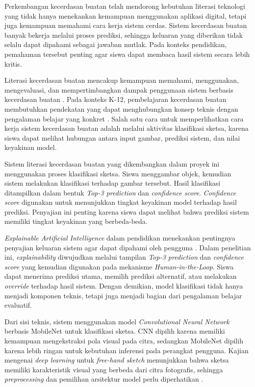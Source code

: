 \documentclass[12pt,a4paper,oneside,openany]{report}
\begin{document}
Perkembangan kecerdasan buatan telah mendorong kebutuhan literasi teknologi yang tidak hanya menekankan kemampuan menggunakan aplikasi digital, tetapi juga kemampuan memahami cara kerja sistem cerdas. Sistem kecerdasan buatan banyak bekerja melalui proses prediksi, sehingga keluaran yang diberikan tidak selalu dapat dipahami sebagai jawaban mutlak. Pada konteks pendidikan, pemahaman tersebut penting agar siswa dapat membaca hasil sistem secara lebih kritis.

Literasi kecerdasan buatan mencakup kemampuan memahami, menggunakan, mengevaluasi, dan mempertimbangkan dampak penggunaan sistem berbasis kecerdasan buatan \cite{ref1}. Pada konteks K-12, pembelajaran kecerdasan buatan membutuhkan pendekatan yang dapat menghubungkan konsep teknis dengan pengalaman belajar yang konkret \cite{ref2}. Salah satu cara untuk memperlihatkan cara kerja sistem kecerdasan buatan adalah melalui aktivitas klasifikasi sketsa, karena siswa dapat melihat hubungan antara input gambar, prediksi sistem, dan nilai keyakinan model.

Sistem literasi kecerdasan buatan yang dikembangkan dalam proyek ini menggunakan proses klasifikasi sketsa. Siswa menggambar objek, kemudian sistem melakukan klasifikasi terhadap gambar tersebut. Hasil klasifikasi ditampilkan dalam bentuk \textit{Top-3 prediction} dan \textit{confidence score}. \textit{Confidence score} digunakan untuk menunjukkan tingkat keyakinan model terhadap hasil prediksi. Penyajian ini penting karena siswa dapat melihat bahwa prediksi sistem memiliki tingkat keyakinan yang berbeda-beda.

\textit{Explainable Artificial Intelligence} dalam pendidikan menekankan pentingnya penyajian keluaran sistem agar dapat dipahami oleh pengguna \cite{ref3}. Dalam penelitian ini, \textit{explainability} diwujudkan melalui tampilan \textit{Top-3 prediction} dan \textit{confidence score} yang kemudian digunakan pada mekanisme \textit{Human-in-the-Loop}. Siswa dapat menerima prediksi utama, memilih prediksi alternatif, atau melakukan \textit{override} terhadap hasil sistem. Dengan demikian, model klasifikasi tidak hanya menjadi komponen teknis, tetapi juga menjadi bagian dari pengalaman belajar evaluatif.

Dari sisi teknis, sistem menggunakan model \textit{Convolutional Neural Network} berbasis MobileNet untuk klasifikasi sketsa. CNN dipilih karena memiliki kemampuan mengekstraksi pola visual pada citra, sedangkan MobileNet dipilih karena lebih ringan untuk kebutuhan inferensi pada perangkat pengguna. Kajian mengenai \textit{deep learning} untuk \textit{free-hand sketch} menunjukkan bahwa sketsa memiliki karakteristik visual yang berbeda dari citra fotografis, sehingga \textit{preprocessing} dan pemilihan arsitektur model perlu diperhatikan \cite{ref6}.
\end{document}
